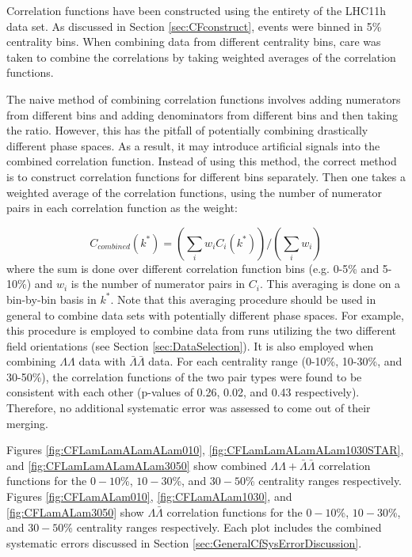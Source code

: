 Correlation functions have been constructed using the entirety of the LHC11h data set.  As discussed in Section \ref{sec:CFconstruct}, events were binned in 5\% centrality bins.  When combining data from different centrality bins, care was taken to combine the correlations by taking weighted averages of the correlation functions.  

The naive method of combining correlation functions involves adding numerators from different bins and adding denominators from different bins and then taking the ratio.  However, this has the pitfall of potentially combining drastically different phase spaces.  As a result, it may introduce artificial signals into the combined correlation function.  Instead of using this method, the correct method is to construct correlation functions for different bins separately.  Then one takes a weighted average of the correlation functions, using the number of numerator pairs in each correlation function as the weight:

\begin{equation}
\label{eq:CombineCF}
C_{combined}(k^*) = (\displaystyle\sum\limits_{i} w_i C_i(k^*))/(\displaystyle\sum\limits_{i} w_i)
\end{equation}
where the sum is done over different correlation function bins (e.g. 0-5\% and 5-10\%) and $w_i$ is the number of numerator pairs in $C_i$.  This averaging is done on a bin-by-bin basis in $k^*$.  Note that this averaging procedure should be used in general to combine data sets with potentially different phase spaces. For example, this procedure is employed to combine data from runs utilizing the two different field orientations (see Section \ref{sec:DataSelection}).  It is also employed when combining $\Lambda\Lambda$ data with $\bar{\Lambda}\bar{\Lambda}$ data.  For each centrality range (0-10\%, 10-30\%, and 30-50\%), the correlation functions of the two pair types were found to be consistent with each other (p-values of 0.26, 0.02, and 0.43 respectively).  Therefore, no additional systematic error was assessed to come out of their merging.

Figures \ref{fig:CFLamLamALamALam010}, \ref{fig:CFLamLamALamALam1030STAR}, and \ref{fig:CFLamLamALamALam3050} show combined $\Lambda\Lambda + \bar{\Lambda}\bar{\Lambda}$ correlation functions for the $0-10$\%, $10-30$\%, and $30-50$\% centrality ranges respectively.  Figures \ref{fig:CFLamALam010}, \ref{fig:CFLamALam1030}, and \ref{fig:CFLamALam3050} show $\Lambda\bar{\Lambda}$ correlation functions for the $0-10$\%, $10-30$\%, and $30-50$\% centrality ranges respectively.  Each plot includes the combined systematic errors discussed in Section \ref{sec:GeneralCfSysErrorDiscussion}.

